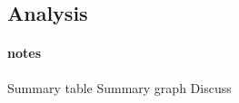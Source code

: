 \documentclass[11pt, parskip=half*,twoside=false]{scrbook}
\begin{document}
%
%
%
%




\subsection{Analysis}
\paragraph{notes}
Summary table 
Summary graph
Discuss
\end{document}
